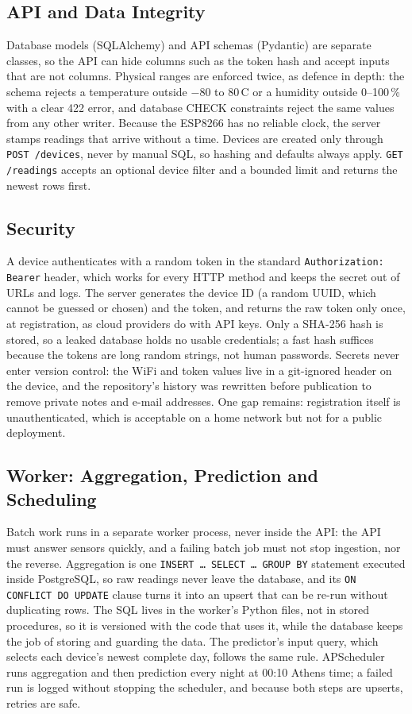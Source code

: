 \documentclass[conference]{IEEEtran}
\newcommand{\degc}{\,\textdegree C}
\begin{document}
\subsection{API and Data Integrity}
Database models (SQLAlchemy) and API schemas (Pydantic) are separate classes, so the API can hide columns such as the token hash and accept inputs that are not columns. Physical ranges are enforced twice, as defence in depth: the schema rejects a temperature outside $-80$ to 80\degc{} or a humidity outside 0--100\,\% with a clear 422 error, and database CHECK constraints reject the same values from any other writer. Because the ESP8266 has no reliable clock, the server stamps readings that arrive without a time. Devices are created only through \texttt{POST /devices}, never by manual SQL, so hashing and defaults always apply. \texttt{GET /readings} accepts an optional device filter and a bounded limit and returns the newest rows first.

\subsection{Security}
A device authenticates with a random token in the standard \texttt{Authorization: Bearer} header, which works for every HTTP method and keeps the secret out of URLs and logs. The server generates the device ID (a random UUID, which cannot be guessed or chosen) and the token, and returns the raw token only once, at registration, as cloud providers do with API keys. Only a SHA-256 hash is stored, so a leaked database holds no usable credentials; a fast hash suffices because the tokens are long random strings, not human passwords. Secrets never enter version control: the WiFi and token values live in a git-ignored header on the device, and the repository's history was rewritten before publication to remove private notes and e-mail addresses. One gap remains: registration itself is unauthenticated, which is acceptable on a home network but not for a public deployment.

\subsection{Worker: Aggregation, Prediction and Scheduling}
Batch work runs in a separate worker process, never inside the API: the API must answer sensors quickly, and a failing batch job must not stop ingestion, nor the reverse. Aggregation is one \texttt{INSERT \ldots{} SELECT \ldots{} GROUP BY} statement executed inside PostgreSQL, so raw readings never leave the database, and its \texttt{ON CONFLICT DO UPDATE} clause turns it into an upsert that can be re-run without duplicating rows. The SQL lives in the worker's Python files, not in stored procedures, so it is versioned with the code that uses it, while the database keeps the job of storing and guarding the data. The predictor's input query, which selects each device's newest complete day, follows the same rule. APScheduler runs aggregation and then prediction every night at 00:10 Athens time; a failed run is logged without stopping the scheduler, and because both steps are upserts, retries are safe.
\end{document}
